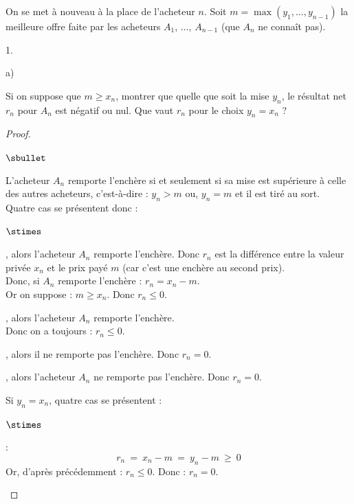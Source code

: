 \noindent
On se met à nouveau à la place de l'acheteur $n$. Soit $m = \max(y_1, 
\ldots, y_{n-1})$ la meilleure offre faite par les acheteurs $A_1$, 
$\ldots$, $A_{n-1}$ (que $A_n$ ne connaît pas).
\begin{noliste}{1.}
  \setlength{\itemsep}{4mm}
  \setcounter{enumi}{11}
  \item \begin{noliste}{a)}
    \setlength{\itemsep}{2mm}
    \item Si on suppose que $m \geq x_n$, montrer que quelle que soit la
    mise $y_n$, le résultat net $r_n$ pour $A_n$ est négatif ou nul. 
    Que vaut $r_n$ pour le choix $y_n = x_n$ ?
    
    \begin{proof}~
      \begin{noliste}{$\sbullet$}
	\item L'acheteur $A_n$ remporte l'enchère si et seulement si
	sa mise est supérieure à celle des autres acheteurs, 
	c'est-à-dire : $y_n > m$ ou, $y_n=m$ et il est tiré au sort.\\
	Quatre cas se présentent donc :
	\begin{noliste}{$\stimes$}
	  \item {}, alors l'acheteur $A_n$
	  remporte l'enchère. Donc $r_n$ est la différence entre 
	  la valeur privée $x_n$ et le prix payé $m$ (car c'est une 
	  enchère au second prix).\\
	  Donc, si $A_n$ remporte l'enchère : $r_n = x_n -m$.\\
	  Or on suppose : $m \geq x_n$. Donc $r_n \leq 0$.
	  
	  \item {}, alors l'acheteur $A_n$ remporte l'enchère.\\
	  Donc on a toujours : $r_n \leq 0$.
	  
	  \item {}, alors il ne remporte pas 
	  l'enchère. Donc $r_n=0$.
	  
	  \item {}, alors l'acheteur $A_n$ ne 
	  remporte pas l'enchère. Donc $r_n=0$.
	\end{noliste}
	
	\item Si $y_n =x_n$, quatre cas se présentent :
	\begin{noliste}{$\stimes$}
	  \item {} :
	  \[
	    r_n \ = \ x_n-m \ = \ y_n - m \ \geq \ 0
	  \]
	  Or, d'après précédemment : $r_n \leq 0$. Donc : $r_n=0$.
	  

\end{noliste}
\end{noliste}
\end{proof}
\end{noliste}
\end{noliste}
